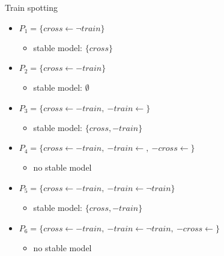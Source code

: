 \begin{frame}[c]{Train spotting}

  \begin{itemize}\itemsep 5pt
    \item<1-2,13>
          \(
          P_1=\{\mathit{cross}\leftarrow{\neg \mathit{train}}\}
          \)
          \begin{itemize}
            \item<2,13> stable model: $\{\mathit{cross}\}$
          \end{itemize}
    \item<1,3-4,13>
          \(
          P_2=\{\mathit{cross}\leftarrow{-\mathit{train}}\}
          \)
          \begin{itemize}
            \item<4,13> stable model: $\emptyset$
          \end{itemize}
    \item<1,5-6,13>
          \(
          P_3=\{\mathit{cross}\leftarrow{-\mathit{train}}, \
          {-\mathit{train}}\leftarrow\}
          \)
          \begin{itemize}
            \item<6,13> stable model: $\{\mathit{cross},{-\mathit{train}}\}$
          \end{itemize}
    \item<1,7-8,13>
          \(
          P_4=\{\mathit{cross}\leftarrow{-\mathit{train}}, \
          {-\mathit{train}}\leftarrow, \
          {-\mathit{cross}}\leftarrow\}
          \)
          \begin{itemize}
            \item<8,13> no stable model
          \end{itemize}
    \item<1,9-10,13>
          \(
          P_5=\{\mathit{cross}\leftarrow{-\mathit{train}}, \
          {-\mathit{train}}\leftarrow{\neg \mathit{train}}\}
          \)
          \begin{itemize}
            \item<10,13> stable model: $\{\mathit{cross},{-\mathit{train}}\}$
          \end{itemize}
    \item<1,11-12,13>
          \(
          P_6=\{\mathit{cross}\leftarrow{-\mathit{train}}, \
          {-\mathit{train}}\leftarrow{\neg \mathit{train}}, \
          {-\mathit{cross}}\leftarrow\}
          \)
          \begin{itemize}
            \item<12,13> no stable model
          \end{itemize}
  \end{itemize}

\end{frame}
